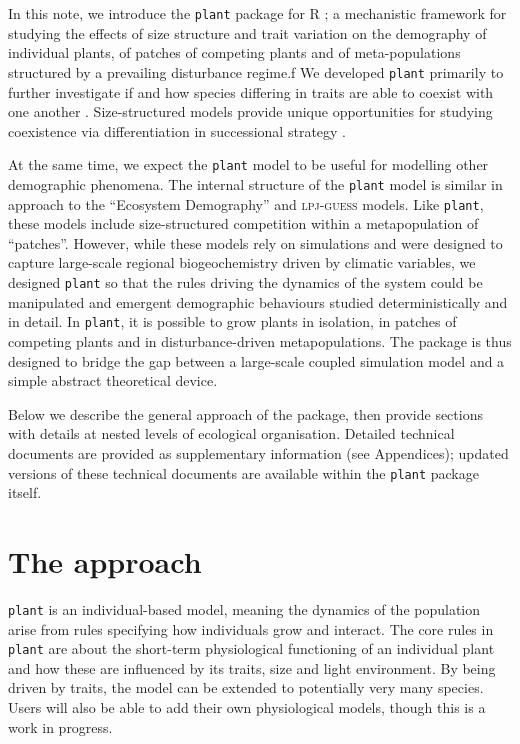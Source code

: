 \documentclass[a4paper,11pt]{article}
\newcommand{\plant}{\texttt{plant}}
\begin{document}
In this note, we introduce the {\plant} package for R \citep{R-2015};
a mechanistic framework for studying the effects of size structure and
trait variation on the demography of individual plants, of patches of
competing plants and of meta-populations structured by a prevailing
disturbance regime.ƒ
%
We developed {\plant} primarily to further investigate if and how species
differing in traits are able to coexist with one another
\citep[following][]{Falster-2011,Falster-2015}.  Size-structured models
provide unique opportunities for studying coexistence via differentiation in
successional strategy \citep{Moorcroft-2001,Huston-1987}.

At the same time, we expect the {\plant} model to be useful for
modelling other demographic phenomena. The internal structure of the {\plant}
model is similar in approach to the ``Ecosystem Demography''
\citep{Moorcroft-2001} and \textsc{lpj-guess} \citep{Smith-2014}
models. Like {\plant}, these models include size-structured
competition within a metapopulation of ``patches''. However, while
these models rely on simulations and were designed to capture large-scale regional
biogeochemistry driven by climatic variables, we designed
{\plant} so that the rules driving the dynamics of the
system could be manipulated and emergent demographic behaviours
studied deterministically and in detail. In {\plant}, it is possible to grow plants in
isolation, in patches of competing plants and in disturbance-driven
metapopulations. The package is thus designed to bridge the gap between
a large-scale coupled simulation model and a simple
abstract theoretical device.

Below we describe the general approach of the package, then provide
sections with details at nested levels of ecological organisation.
Detailed technical documents are provided as supplementary information
(see Appendices); updated versions of these technical documents are
available within the {\plant} package itself.

\section{The approach}

{\plant} is an individual-based model, meaning the dynamics of the population arise from rules specifying how individuals grow and interact. The
core rules in {\plant} are about the short-term physiological
functioning of an individual plant and how these are influenced by its
traits, size and light environment. By being driven by traits, the
model can be extended to potentially very many species. Users will
also be able to add their own physiological models, though this is a
work in progress.
\end{document}
